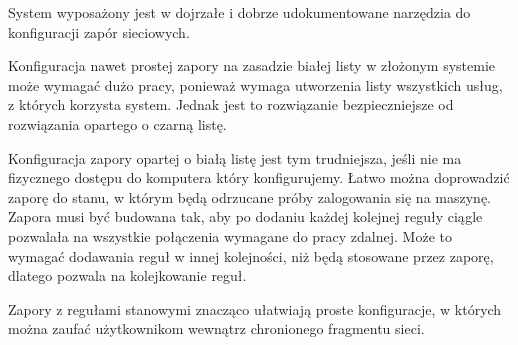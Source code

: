 System \bsd{} wyposażony jest w dojrzałe i dobrze udokumentowane narzędzia do
konfiguracji zapór sieciowych.

Konfiguracja nawet prostej zapory na zasadzie białej listy w złożonym systemie
może wymagać dużo pracy, ponieważ wymaga utworzenia listy wszystkich usług, z
których korzysta system. Jednak jest to rozwiązanie bezpieczniejsze od
rozwiązania opartego o czarną listę.

Konfiguracja zapory opartej o białą listę jest tym trudniejsza, jeśli nie ma
fizycznego dostępu do komputera który konfigurujemy. Łatwo można doprowadzić
zaporę do stanu, w którym będą odrzucane próby zalogowania się na maszynę.
Zapora musi być budowana tak, aby po dodaniu każdej kolejnej reguły ciągle
pozwalała na wszystkie połączenia wymagane do pracy zdalnej. Może to wymagać
dodawania reguł w innej kolejności, niż będą stosowane przez zaporę, dlatego
\ipfw{} pozwala na kolejkowanie reguł.

Zapory z regułami stanowymi znacząco ułatwiają proste konfiguracje, w których
można zaufać użytkownikom wewnątrz chronionego fragmentu sieci.
